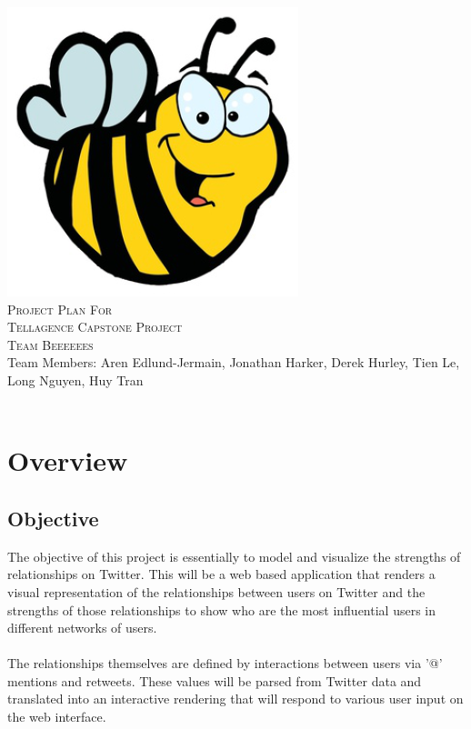 \documentclass[12pt, letterpaper]{article}
\begin{document}
\begin{titlepage}

\begin{center}
\includegraphics[width=.5\textwidth]{./bee}\\[2cm]
\textsc{\LARGE Project Plan For}\\[1.5cm]
\textsc{\LARGE Tellagence Capstone Project}\\[1.5cm]
\textsc{\LARGE Team Beeeeees}\\[1.5cm]
\large Team Members: Aren Edlund-Jermain, Jonathan Harker, Derek Hurley, Tien Le, Long Nguyen, Huy Tran\\
\hfill \\
\end{center}

\vfill

\end{titlepage}

\tableofcontents
\pagebreak 

\section{Overview}
	\subsection{Objective}
	The objective of this project is essentially to model and visualize the strengths of relationships on Twitter. This will be a web based application that renders a visual representation of the relationships between users on Twitter and the strengths of those relationships to show who are the most influential users in different networks of users.
	\\\\
	The relationships themselves are defined by interactions between users via '@' mentions and retweets. These values will be parsed from Twitter data and translated into an interactive rendering that will respond to various user input on the web interface.
\end{document}

